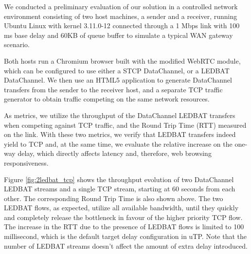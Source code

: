 \documentclass{sig-alternate}
\begin{document}


We conducted a preliminary evaluation of our solution in a controlled network environment
consisting of two host machines, a sender and a receiver, running Ubuntu Linux with kernel
3.11.0-12 connected through a 1 Mbps link with 100 ms base delay and 60KB of queue
buffer to simulate a typical WAN gateway scenario.

%

Both hosts run a Chromium browser built with the modified WebRTC module, which can be configured to use either a STCP DataChannel, or a LEDBAT DataChannel. We then use an HTML5 application to generate DataChannel transfers from the sender to the receiver host, and a separate TCP traffic generator to obtain traffic competing on the same network resources.

As metrics, we utilize the throughput of the DataChannel LEDBAT transfers when competing
against TCP traffic, and the Round Trip Time (RTT) measured on the link. With these two
metrics, we verify that LEDBAT transfers indeed yield to TCP and, at the same time, we
evaluate the relative increase on the one-way delay, which directly affects latency and,
therefore, web browsing responsiveness.

Figure \ref{fig:2ledbat_tcp} shows the throughput evolution of two DataChannel LEDBAT
streams and a single TCP stream, starting at 60 seconds from each other. The corresponding
Round Trip Time is also shown above. The two LEDBAT flows, as expected, utilize all
available bandwidth, until they quickly and completely release the bottleneck in favour of
the higher priority TCP flow. The increase in the RTT due to the presence of LEDBAT flows
is limited to 100 millisecond, which is the default target delay configuration in
uTP. Note that the number of LEDBAT streams doesn't affect the amount of extra delay
introduced.
\end{document}
